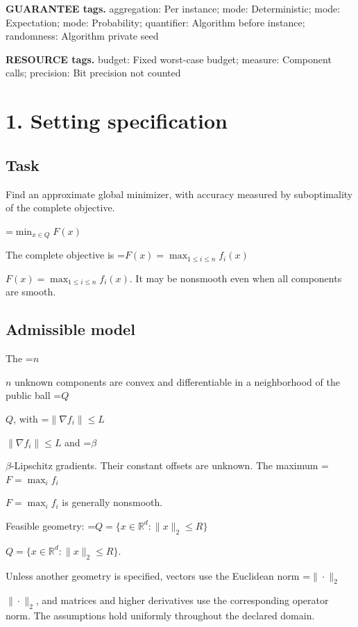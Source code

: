 \documentclass[10pt,a4paper]{article}
\newcommand{\AtlasMath}[1]{\par\begingroup\centering\setbox0=\hbox{$\displaystyle #1$}\ifdim\wd0>1.4\linewidth\typeout{ATLAS WIDE FORMULA: \the\wd0}\fi\ifdim\wd0>\linewidth\resizebox{\linewidth}{!}{\box0}\else\box0\fi\par\endgroup}
\newcommand{\AtlasInlineMath}[1]{\begingroup\setbox0=\hbox{$#1$}\ifdim\wd0>.4\linewidth\endgroup\AtlasMath{#1}\else\endgroup$#1$\fi}
\begin{document}
\textbf{GUARANTEE tags.} aggregation: Per instance; mode: Deterministic; mode: Expectation; mode: Probability; quantifier: Algorithm before instance; randomness: Algorithm private seed



\textbf{RESOURCE tags.} budget: Fixed worst-case budget; measure: Component calls; precision: Bit precision not counted



\section{1. Setting specification}


\subsection{Task}


Find an approximate global minimizer, with accuracy measured by suboptimality of the complete objective.




\AtlasMath{\min_{x\in Q}F(x)}




The complete objective is \AtlasInlineMath{F(x)=\max_{1\le i\le n}f_i(x)}. It may be nonsmooth even when all components are smooth.



\subsection{Admissible model}


The \AtlasInlineMath{n} unknown components are convex and differentiable in a neighborhood of the public ball \AtlasInlineMath{Q}, with \AtlasInlineMath{\|\nabla f_i\|\le L} and \AtlasInlineMath{\beta}-Lipschitz gradients. Their constant offsets are unknown. The maximum \AtlasInlineMath{F=\max_i f_i} is generally nonsmooth.



Feasible geometry: \AtlasInlineMath{Q=\{x\in\mathbb{R}^d:\|x\|_2\le R\}}.



Unless another geometry is specified, vectors use the Euclidean norm \AtlasInlineMath{\|\cdot\|_2}, and matrices and higher derivatives use the corresponding operator norm. The assumptions hold uniformly throughout the declared domain.
\end{document}
